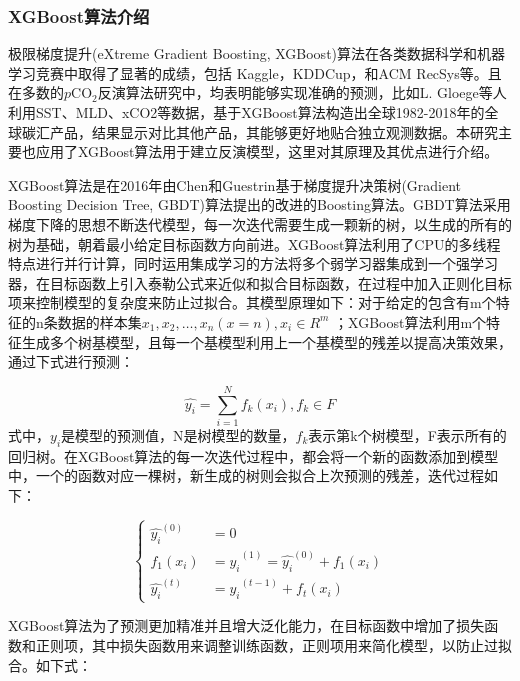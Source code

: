 \subsubsection{XGBoost算法介绍}
极限梯度提升(eXtreme Gradient Boosting, XGBoost)算法在各类数据科学和机器学习竞赛中取得了显著的成绩，包括 Kaggle，KDDCup，和ACM RecSys等\cite{abou2018xgboost,dhaliwal2018effective}。且在多数的$p\mathrm{CO_2}$反演算法研究中，均表明能够实现准确的预测\cite{stamell2020strengths,joshi2022modeling,song2023construction,gloege2022improved}，比如L. Gloege等人\cite{gloege2022improved}利用SST、MLD、xCO2等数据，基于XGBoost算法构造出全球1982-2018年的全球碳汇产品，结果显示对比其他产品，其能够更好地贴合独立观测数据。本研究主要也应用了XGBoost算法用于建立反演模型，这里对其原理及其优点进行介绍。

XGBoost算法是在2016年\cite{2016XGBoost}由Chen和Guestrin基于梯度提升决策树(Gradient Boosting Decision Tree, GBDT)算法提出的改进的Boosting算法。GBDT算法采用梯度下降的思想不断迭代模型，每一次迭代需要生成一颗新的树，以生成的所有的树为基础，朝着最小给定目标函数方向前进。XGBoost算法利用了CPU的多线程特点进行并行计算，同时运用集成学习的方法将多个弱学习器集成到一个强学习器，在目标函数上引入泰勒公式来近似和拟合目标函数，在过程中加入正则化目标项来控制模型的复杂度来防止过拟合。其模型原理如下：对于给定的包含有m个特征的n条数据的样本集${x_1,x_2,…,x_n}(x=n),x_i\in R^m$ ；XGBoost算法利用m个特征生成多个树基模型，且每一个基模型利用上一个基模型的残差以提高决策效果，通过下式进行预测：

\begin{equation}
    \label{equ:xgb-1}
   \widehat{y_i}= \sum _{i=1}^{N}f_k(x_i),f_k\in F
\end{equation}
式中，$y_i$是模型的预测值，N是树模型的数量，$f_k$表示第k个树模型，F表示所有的回归树。在XGBoost算法的每一次迭代过程中，都会将一个新的函数添加到模型中，一个的函数对应一棵树，新生成的树则会拟合上次预测的残差，迭代过程如下：

\begin{equation}
    \label{equ:xgb-2}
    \left\{
        \begin{aligned}
        \widehat{y_i}^{(0)} &= 0\\
        f_1(x_i) &= \widehat{y_i}^{(1)} = \widehat{y_i}^{(0)} + f_1(x_i) \\
        \widehat{y_i}^{(t)} &= \widehat{y_i}^{(t-1)} + f_t(x_i)
        \end{aligned}
    \right.
\end{equation}

XGBoost算法为了预测更加精准并且增大泛化能力，在目标函数中增加了损失函数和正则项，其中损失函数用来调整训练函数，正则项用来简化模型，以防止过拟合。如下式：

